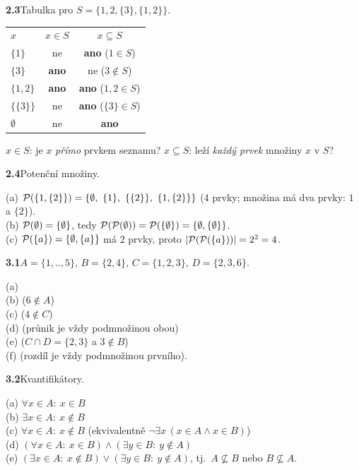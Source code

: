 \documentclass[11pt,a4paper]{article}
\newcommand{\zad}[2]{\par\Needspace*{4cm}\vspace{1.1em}\noindent\textcolor{accent}{\sffamily\bfseries #1}\enspace #2\par}
\begin{document}
\zad{2.3}{Tabulka pro $S=\{1,2,\{3\},\{1,2\}\}$.}
\begin{reseni}
\renewcommand{\arraystretch}{1.25}
\begin{tabular}{@{}lcc@{}}
$x$ & $x\in S$ & $x\subseteq S$\\
$\{1\}$ & ne & \textbf{ano} ($1\in S$)\\
$\{3\}$ & \textbf{ano} & ne ($3\notin S$)\\
$\{1,2\}$ & \textbf{ano} & \textbf{ano} ($1,2\in S$)\\
$\{\{3\}\}$ & ne & \textbf{ano} ($\{3\}\in S$)\\
$\emptyset$ & ne & \textbf{ano}
\end{tabular}

\smallskip
{\sffamily\footnotesize\color{muted}$x\in S$: je $x$ \emph{přímo} prvkem seznamu? $x\subseteq S$: leží \emph{každý prvek} množiny $x$ v $S$?}
\end{reseni}

\zad{2.4}{Potenční množiny.}
\begin{reseni}
(a) $\Pot(\{1,\{2\}\})=\{\emptyset,\ \{1\},\ \{\{2\}\},\ \{1,\{2\}\}\}$ (4 prvky; množina má dva prvky: $1$ a $\{2\}$).\\
(b) $\mathcal P(\emptyset)=\{\emptyset\}$, tedy $\mathcal P(\mathcal P(\emptyset))=\mathcal P(\{\emptyset\})=\{\emptyset,\{\emptyset\}\}$.\\
(c) $\mathcal P(\{a\})=\{\emptyset,\{a\}\}$ má 2 prvky, proto $|\mathcal P(\mathcal P(\{a\}))|=2^2=4$.
\end{reseni}


\zad{3.1}{$A=\{1,..,5\}$, $B=\{2,4\}$, $C=\{1,2,3\}$, $D=\{2,3,6\}$.}
\begin{reseni}
(a) \pravda\\
(b) \nepravda ($6\notin A$)\\
(c) \nepravda ($4\notin C$)\\
(d) \pravda (průnik je vždy podmnožinou obou)\\
(e) \nepravda ($C\cap D=\{2,3\}$ a $3\notin B$)\\
(f) \pravda (rozdíl je vždy podmnožinou prvního).
\end{reseni}

\zad{3.2}{Kvantifikátory.}
\begin{reseni}
(a) $\forall x\in A:\ x\in B$\\
(b) $\exists x\in A:\ x\notin B$\\
(c) $\forall x\in A:\ x\notin B$ (ekvivalentně $\neg\exists x\,(x\in A\land x\in B)$)\\
(d) $(\forall x\in A:\ x\in B)\land(\exists y\in B:\ y\notin A)$\\
(e) $(\exists x\in A:\ x\notin B)\lor(\exists y\in B:\ y\notin A)$, tj.\ $A\nsubseteq B$ nebo $B\nsubseteq A$.
\end{reseni}
\end{document}
